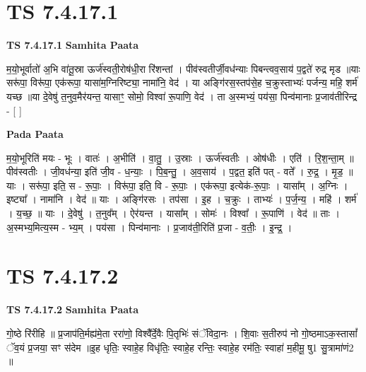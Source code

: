 \documentclass[17pt]{extarticle}
\begin{document}

\section{ TS 7.4.17.1 }

\textbf{TS 7.4.17.1 } \newline
\textbf{Samhita Paata} \newline

म॒यो॒भूर्वातो॑ अ॒भि वा॑तू॒स्रा ऊर्ज॑स्वती॒रोष॑धी॒रा रि॑शन्तां । पीव॑स्वतीर्जी॒वध॑न्याः पिबन्त्वव॒साय॑ प॒द्वते॑ रुद्र मृड ॥याः सरू॑पा॒ विरू॑पा॒ एक॑रूपा॒ यासा॑म॒ग्निरिष्ट्या॒ नामा॑नि॒ वेद॑ । या अङ्गि॑रस॒स्तप॑से॒ह च॒क्रुस्ताभ्यः॑ पर्जन्य॒ महि॒ शर्म॑ यच्छ ॥या दे॒वेषु॑ त॒नुव॒मैर॑यन्त॒ यासाꣳ॒॒ सोमो॒ विश्वा॑ रू॒पाणि॒ वेद॑ । ता अ॒स्मभ्यं॒ पय॑सा॒ पिन्व॑मानाः प्र॒जाव॑तीरिन्द्र - [  ] \newline

\textbf{Pada Paata} \newline

म॒यो॒भूरिति॑ मयः - भूः । वातः॑ । अ॒भीति॑ । वा॒तु॒ । उ॒स्राः । ऊर्ज॑स्वतीः । ओष॑धीः । एति॑ । रि॒श॒न्ता॒म् ॥ पीव॑स्वतीः । जी॒वध॑न्या॒ इति॑ जी॒व - ध॒न्याः॒ । पि॒ब॒न्तु॒ । अ॒व॒साय॑ । प॒द्वत॒ इति॑ पत् - वते᳚ । रु॒द्र॒ । मृ॒ड॒ ॥ याः । सरू॑पा॒ इति॒ स - रू॒पाः॒ । विरू॑पा॒ इति॒ वि - रू॒पाः॒ । एक॑रूपा॒ इत्येक॑-रू॒पाः॒ । यासा᳚म् । अ॒ग्निः । इष्ट्या᳚ । नामा॑नि । वेद॑ ॥ याः । अङ्गि॑रसः । तप॑सा । इ॒ह । च॒क्रुः । ताभ्यः॑ । प॒र्ज॒न्य॒ । महि॑ । शर्म॑ । य॒च्छ॒ ॥ याः । दे॒वेषु॑ । त॒नुव᳚म् । ऐर॑यन्त । यासा᳚म् । सोमः॑ । विश्वा᳚ । रू॒पाणि॑ । वेद॑ ॥ ताः । अ॒स्मभ्य॒मित्य॒स्म - भ्य॒म् । पय॑सा । पिन्व॑मानाः । प्र॒जाव॑ती॒रिति॑ प्र॒जा - व॒तीः॒ । इ॒न्द्र॒ ।  \newline





\section{ TS 7.4.17.2 }

\textbf{TS 7.4.17.2 } \newline
\textbf{Samhita Paata} \newline

गो॒ष्ठे रि॑रीहि ॥ प्र॒जाप॑ति॒र्मह्य॑मे॒ता ररा॑णो॒ विश्वै᳚र्दे॒वैः पि॒तृभिः॑ संॅविदा॒नः । शि॒वाः स॒तीरुप॑ नो गो॒ष्ठमाऽक॒स्तासां᳚ ॅव॒यं प्र॒जया॒ सꣳ स॑देम ॥इ॒ह धृतिः॒ स्वाहे॒ह विधृ॑तिः॒ स्वाहे॒ह रन्तिः॒ स्वाहे॒ह रम॑तिः॒ स्वाहा॑ म॒हीमू॒ षु1 सु॒त्रामा॑णं2 ॥ \newline
\end{document}
